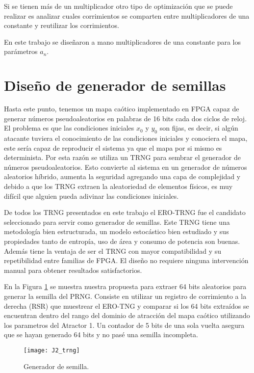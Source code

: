     Si se tienen más de un multiplicador otro tipo de optimización que se puede realizar es analizar cuales corrimientos se comparten entre multiplicadores de una constante y reutilizar los corrimientos.

    En este trabajo se diseñaron a mano multiplicadores de una constante para los parámetros $a_{n}$.

    \section{Diseño de generador de semillas}

        Hasta este punto, tenemos un mapa caótico implementado en FPGA capaz de generar números pseudoaleatorios en palabras de 16 bits cada dos ciclos de reloj. El problema es que las condiciones iniciales $x_{0}$ y $y_{0}$ son fijas, es decir, si algún atacante tuviera el conocimiento de las condiciones iniciales y conociera el mapa, este sería capaz de reproducir el sistema ya que el mapa por si mismo es determinista. Por esta razón se utiliza un TRNG para sembrar el generador de números pseudoaleatorios. Esto convierte al sistema en un generador de números aleatorios híbrido, aumenta la seguridad agregando una capa de complejidad y debido a que los TRNG extraen la aleatoriedad de elementos físicos, es muy difícil que alguien pueda adivinar las condiciones iniciales. 

        De todos los TRNG presentados en este trabajo el ERO-TRNG fue el candidato seleccionado para servir como generador de semillas. Este TRNG tiene una metodología bien estructurada, un modelo estocástico bien estudiado y sus propiedades tanto de entropía, uso de área y consumo de potencia son buenas. Además tiene la ventaja de ser el TRNG con mayor compatibilidad y su repetibilidad entre familias de FPGA. El diseño no requiere ninguna intervención manual para obtener resultados satisfactorios. 

        En la Figura \ref{fig:J2_trng} se muestra nuestra propuesta para extraer 64 bits aleatorios para generar la semilla del PRNG. Consiste en utilizar un registro de corrimiento a la derecha (RSR) que muestrear el ERO-TNG y comparar si los 64 bits extraídos se encuentran dentro del rango del dominio de atracción del mapa caótico utilizando los parametros del Atractor 1. Un contador de 5 bits de una sola vuelta asegura que se hayan generado 64 bits y no pasé una semilla incompleta.

        \begin{figure}[hbtp]
            \caption{Generador de semilla.}
            \centering
            \texttt{[image: J2\_trng]}
            \label{fig:J2_trng}
        \end{figure}

